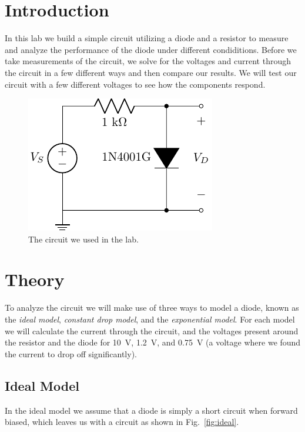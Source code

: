 \documentclass{../../ece-report}
\begin{document}
\maketitle
\section{Introduction}

In this lab we build a simple circuit utilizing a diode
and a resistor to measure and analyze the performance
of the diode under different condiditions. Before we
take measurements of the circuit, we solve for the voltages
and current through the circuit in a few different ways
and then compare our results. We will test our circuit
with a few different voltages to see how the components
respond.

\begin{figure}[h!]
  \centering
  \includegraphics{../circuits/circuit1.pdf}
  \caption{The circuit we used in the lab.}
  \label{fig:circuit}
\end{figure}


\section{Theory}

To analyze the circuit we will make use of three ways
to model a diode, known as the \emph{ideal model}, \emph{constant
drop model}, and the \emph{exponential model}. For each
model we will calculate the current through the circuit,
and the voltages present around the resistor and the
diode for 10~V, 1.2~V, and 0.75~V (a voltage where we
found the current to drop off significantly).

\subsection{Ideal Model}

In the ideal model we assume that a diode is simply
a short circuit when forward biased, which leaves us
with a circuit as shown in Fig.~\ref{fig:ideal}.
\end{document}
